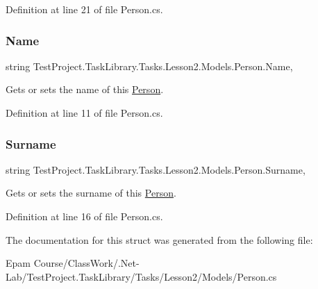 Definition at line 21 of file Person.\+cs.

\mbox{\label{struct_test_project_1_1_task_library_1_1_tasks_1_1_lesson2_1_1_models_1_1_person_a278b35880a61b47b0ca047f61f09dfbd}} 
\subsubsection{\texorpdfstring{Name}{Name}}
{\footnotesize\ttfamily string Test\+Project.\+Task\+Library.\+Tasks.\+Lesson2.\+Models.\+Person.\+Name\hspace{0.3cm}{\ttfamily [get]}, {\ttfamily [set]}}



Gets or sets the name of this \mbox{\hyperlink{struct_test_project_1_1_task_library_1_1_tasks_1_1_lesson2_1_1_models_1_1_person}{Person}}. 



Definition at line 11 of file Person.\+cs.

\mbox{\label{struct_test_project_1_1_task_library_1_1_tasks_1_1_lesson2_1_1_models_1_1_person_a753f2350fedcb5cd27462518caf030a7}} 
\subsubsection{\texorpdfstring{Surname}{Surname}}
{\footnotesize\ttfamily string Test\+Project.\+Task\+Library.\+Tasks.\+Lesson2.\+Models.\+Person.\+Surname\hspace{0.3cm}{\ttfamily [get]}, {\ttfamily [set]}}



Gets or sets the surname of this \mbox{\hyperlink{struct_test_project_1_1_task_library_1_1_tasks_1_1_lesson2_1_1_models_1_1_person}{Person}}. 



Definition at line 16 of file Person.\+cs.



The documentation for this struct was generated from the following file\+:\begin{DoxyCompactItemize}
\item 
Epam Course/\+Class\+Work/.\+Net-\/\+Lab/\+Test\+Project.\+Task\+Library/\+Tasks/\+Lesson2/\+Models/Person.\+cs\end{DoxyCompactItemize}
